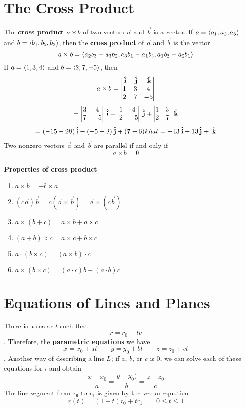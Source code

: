 \section{The Cross Product}
The \textbf{cross product $a\times b$} of two vectors $\vec{a}$ and $\vec{b}$ is a vector.
If $a = \ev{a_1, a_2, a_3}$ and $b = \ev{b_1, b_2, b_3}$, then the \textbf{cross product} of $\vec{a}$ and $\vec{b}$ is the vector
$$a\times b = \ev{a_2b_3 - a_3b_2, a_3b_1 - a_1b_3, a_1b_2 - a_2b_1}$$
If $a = \ev{1, 3, 4}$ and $b = \ev{2, 7, -5}$, then 
$$a\times b = \begin{vmatrix}
    \:\boldsymbol{\hat{\textbf{i}}}&\:\boldsymbol{\hat{\textbf{j}}}&\:\boldsymbol{\hat{\textbf{k}}}\\1&3&4\\2&7&-5
\end{vmatrix}$$
$$= \begin{vmatrix}
    3&4\\7&-5
\end{vmatrix}\:\boldsymbol{\hat{\textbf{i}}} - \begin{vmatrix}
    1&4\\2&-5
\end{vmatrix}\:\boldsymbol{\hat{\textbf{j}}} + \begin{vmatrix}
    1&3\\2&7
\end{vmatrix}\:\boldsymbol{\hat{\textbf{k}}}$$ 
$$= (-15-28)\:\boldsymbol{\hat{\textbf{i}}} - (-5 - 8)\:\boldsymbol{\hat{\textbf{j}}} + (7 - 6)khat = -43\:\boldsymbol{\hat{\textbf{i}}} + 13\:\boldsymbol{\hat{\textbf{j}}} + \:\boldsymbol{\hat{\textbf{k}}}$$
Two nonzero vectors $\vec{a}$ and $\vec{b}$ are parallel if and only if $$a\times b = 0$$\\
\textbf{Properties of cross product}
\begin{enumerate}
    \item $a\times b = -b\times a$
    \item $(c\vec{a})\vec{b} = c(\vec{a}\times\vec{b}) = \vec{a}\times (c\vec{b})$
    \item $a\times(b + c) = a\times b + a\times c$
    \item $(a + b)\times c = a\times c + b\times c$
    \item $a\cdot (b\times c) = (a\times b)\cdot c$
    \item $a\times (b\times c) = (a\cdot c)b - (a\cdot b)c$
\end{enumerate} 

\section{Equations of Lines and Planes}
There is a scalar $t$ such that $$r = r_0 + tv$$. Therefore, the \textbf{parametric equations} we have $$x = x_0 + at\qquad y = y_0 + bt\qquad z = z_0 + ct$$.
Another way of describing a line $L$; if $a$, $b$, or $c$ is 0, we can solve each of these equations for $t$ and obtain 
$$\frac{x - x_0}{a} = \frac{y - y_0)}{b} = \frac{z - z_0}{c}$$
The line segment from $r_0$ to $r_1$ is given by the vector equation
$$r(t) = (1-t)r_0 + tr_1\qquad 0\leq t\leq 1$$


